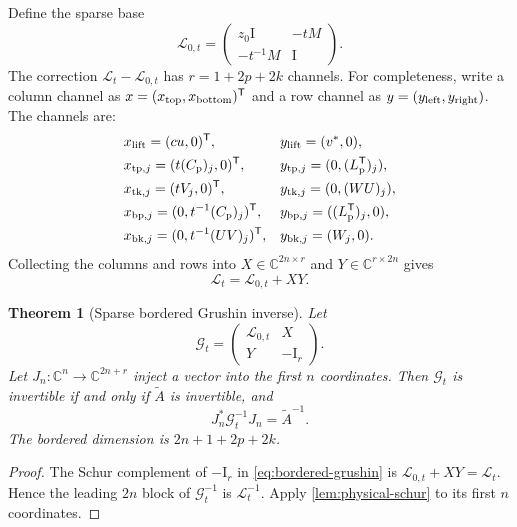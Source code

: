 \documentclass[11pt]{article}
\newtheorem{theorem}{Theorem}[section]
\theoremstyle{definition}
\theoremstyle{remark}
\newcommand{\C}{\mathbb C}
\newcommand{\Id}{\mathrm I}
\newcommand{\Atilde}{\widetilde A}
\newcommand{\Gmat}{\mathcal G}
\newcommand{\Lmat}{\mathcal L}
\begin{document}
Define the sparse base
\begin{equation}
 \Lmat_{0,t}=
 \begin{pmatrix}
  z_0\Id & -tM\\
  -t^{-1}M & \Id
 \end{pmatrix}.
 \label{eq:sparse-base}
\end{equation}
The correction $\Lmat_t-\Lmat_{0,t}$ has
$r=1+2p+2k$ channels.  For completeness, write a column channel as
$x=(x_{\rm top},x_{\rm bottom})^{\mathsf T}$ and a row channel as
$y=(y_{\rm left},y_{\rm right})$.  The channels are:
\begin{align*}
 &x_{\rm lift}=(cu,0)^{\mathsf T},
 &&y_{\rm lift}=(v^*,0),\\
 &x_{{\rm tp},j}=(t(C_{\rm p})_j,0)^{\mathsf T},
 &&y_{{\rm tp},j}=(0,(L_{\rm p}^{\mathsf T})_j),\\
 &x_{{\rm tk},j}=(tV_j,0)^{\mathsf T},
 &&y_{{\rm tk},j}=(0,(WU)_j),\\
 &x_{{\rm bp},j}=(0,t^{-1}(C_{\rm p})_j)^{\mathsf T},
 &&y_{{\rm bp},j}=((L_{\rm p}^{\mathsf T})_j,0),\\
 &x_{{\rm bk},j}=(0,t^{-1}(UV)_j)^{\mathsf T},
 &&y_{{\rm bk},j}=(W_j,0).
\end{align*}
Collecting the columns and rows into
$X\in\C^{2n\times r}$ and $Y\in\C^{r\times2n}$ gives
\begin{equation}
 \Lmat_t=\Lmat_{0,t}+XY.
 \label{eq:low-rank-linearization}
\end{equation}

\begin{theorem}[Sparse bordered Grushin inverse]
\label{thm:sparse-grushin}
Let
\begin{equation}
 \Gmat_t=
 \begin{pmatrix}
  \Lmat_{0,t} & X\\
  Y & -\Id_r
 \end{pmatrix}.
 \label{eq:bordered-grushin}
\end{equation}
Let $J_n:\C^n\to\C^{2n+r}$ inject a vector into the first $n$
coordinates.  Then $\Gmat_t$ is invertible if and only if $\Atilde$ is
invertible, and
\begin{equation}
 J_n^*\Gmat_t^{-1}J_n=\Atilde^{-1}.
 \label{eq:grushin-physical-block}
\end{equation}
The bordered dimension is $2n+1+2p+2k$.
\end{theorem}

\begin{proof}
The Schur complement of $-\Id_r$ in
\cref{eq:bordered-grushin} is
$\Lmat_{0,t}+XY=\Lmat_t$.  Hence the leading $2n$ block of
$\Gmat_t^{-1}$ is $\Lmat_t^{-1}$.  Apply
\cref{lem:physical-schur} to its first $n$ coordinates.
\end{proof}
\end{document}
